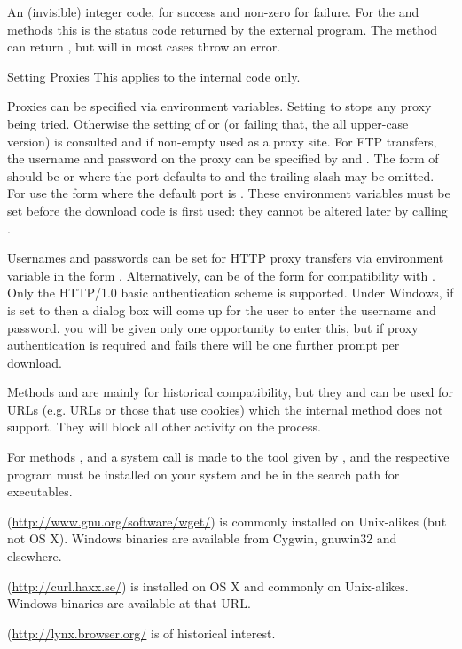 %
\begin{Value}
An (invisible) integer code,  for success and non-zero for
failure.  For the  and  methods this is the
status code returned by the external program.  The 
method can return , but will in most cases throw an error.
\end{Value}
%
\begin{Section}{Setting Proxies}
This applies to the internal code only.

Proxies can be specified via environment variables.
Setting  to  stops any proxy being tried.
Otherwise the setting of  or 
(or failing that, the all upper-case version) is consulted and if
non-empty used as a proxy site.  For FTP transfers, the username
and password on the proxy can be specified by 
and .  The form of 
should be  or
 where the port defaults to
 and the trailing slash may be omitted. For
 use the form 
where the default port is .  These environment variables
must be set before the download code is first used: they cannot be
altered later by calling .

Usernames and passwords can be set for HTTP proxy transfers via
environment variable  in the form
.  Alternatively,  can be of the
form  for compatibility
with .  Only the HTTP/1.0 basic authentication scheme is
supported.
Under Windows, if  is set to  then
a dialog box will come up for the user to enter the username and
password.   you will be given only one opportunity to enter this,
but if proxy authentication is required and fails there will be one
further prompt per download.
\end{Section}
%
\begin{Note}\relax
Methods  and  are mainly for historical
compatibility, but they and  can be used for URLs
(e.g.  URLs or those that use cookies) which the
internal method does not support.  They will block all other activity
on the \R{} process.

For methods , and  a system
call is made to the tool given by , and the respective
program must be installed on your system and be in the search path for
executables.

 (\url{http://www.gnu.org/software/wget/}) is commonly
installed on Unix-alikes (but not OS X). Windows binaries are
available from Cygwin, gnuwin32 and elsewhere.

 (\url{http://curl.haxx.se/}) is installed on OS X and
commonly on Unix-alikes.  Windows binaries are available at that URL.

 (\url{http://lynx.browser.org/} is of historical interest.
\end{Note}
